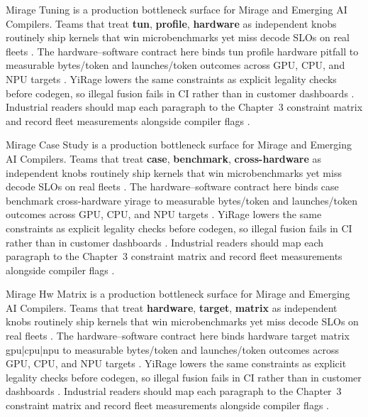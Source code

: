 Mirage Tuning is a production bottleneck surface for Mirage and Emerging AI Compilers. Teams that treat \textbf{tun}, \textbf{profile}, \textbf{hardware} as independent knobs routinely ship kernels that win microbenchmarks yet miss decode SLOs on real fleets \citep{nvidia2024cudagraphs,taxbreak2026}. The hardware--software contract here binds tun profile hardware pitfall to measurable bytes/token and launches/token outcomes across GPU, CPU, and NPU targets \citep{liu2024deepseekv3,memoryfloor2026}. YiRage lowers the same constraints as explicit legality checks before codegen, so illegal fusion fails in CI rather than in customer dashboards \citep{patel2025llminference,nvidia2022hopper}. Industrial readers should map each paragraph to the Chapter~3 constraint matrix and record fleet measurements alongside compiler flags \citep{taxbreak2026,semianalysis2024tma}.

Mirage Case Study is a production bottleneck surface for Mirage and Emerging AI Compilers. Teams that treat \textbf{case}, \textbf{benchmark}, \textbf{cross-hardware} as independent knobs routinely ship kernels that win microbenchmarks yet miss decode SLOs on real fleets \citep{liu2024deepseekv3,memoryfloor2026}. The hardware--software contract here binds case benchmark cross-hardware yirage to measurable bytes/token and launches/token outcomes across GPU, CPU, and NPU targets \citep{patel2025llminference,nvidia2022hopper}. YiRage lowers the same constraints as explicit legality checks before codegen, so illegal fusion fails in CI rather than in customer dashboards \citep{taxbreak2026,semianalysis2024tma}. Industrial readers should map each paragraph to the Chapter~3 constraint matrix and record fleet measurements alongside compiler flags \citep{memoryfloor2026,amd2024xdna}.

Mirage Hw Matrix is a production bottleneck surface for Mirage and Emerging AI Compilers. Teams that treat \textbf{hardware}, \textbf{target}, \textbf{matrix} as independent knobs routinely ship kernels that win microbenchmarks yet miss decode SLOs on real fleets \citep{patel2025llminference,nvidia2022hopper}. The hardware--software contract here binds hardware target matrix gpu|cpu|npu to measurable bytes/token and launches/token outcomes across GPU, CPU, and NPU targets \citep{taxbreak2026,semianalysis2024tma}. YiRage lowers the same constraints as explicit legality checks before codegen, so illegal fusion fails in CI rather than in customer dashboards \citep{memoryfloor2026,amd2024xdna}. Industrial readers should map each paragraph to the Chapter~3 constraint matrix and record fleet measurements alongside compiler flags \citep{nvidia2022hopper,amd2024aie}.

